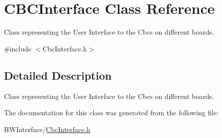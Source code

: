 \hypertarget{class_c_b_c_interface}{\section{C\-B\-C\-Interface Class Reference}
\label{class_c_b_c_interface}
}


Class representing the User Interface to the Cbcs on different boards.  




{\ttfamily \#include $<$Cbc\-Interface.\-h$>$}



\subsection{Detailed Description}
Class representing the User Interface to the Cbcs on different boards. 

The documentation for this class was generated from the following file\-:\begin{DoxyCompactItemize}
\item 
H\-W\-Interface/\hyperlink{_cbc_interface_8h}{Cbc\-Interface.\-h}\end{DoxyCompactItemize}
